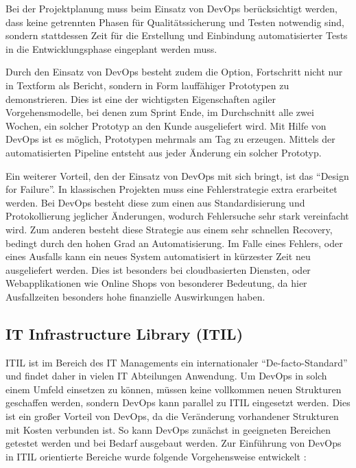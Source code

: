 Bei der Projektplanung muss beim Einsatz von DevOps berücksichtigt werden, dass keine getrennten Phasen für Qualitätssicherung und Testen notwendig sind, sondern stattdessen Zeit für die Erstellung und Einbindung automatisierter Tests in die Entwicklungsphase eingeplant werden muss. \parencite[Vgl.][S. 2]{Null:2014}

Durch den Einsatz von DevOps besteht zudem die Option, Fortschritt nicht nur in Textform als Bericht, sondern in Form lauffähiger Prototypen zu demonstrieren. 
Dies ist eine der wichtigsten Eigenschaften agiler Vorgehensmodelle, bei denen zum Sprint Ende, im Durchschnitt alle zwei Wochen, ein solcher Prototyp an den Kunde ausgeliefert wird. 
Mit Hilfe von DevOps ist es möglich, Prototypen mehrmals am Tag zu erzeugen. Mittels der automatisierten Pipeline entsteht aus jeder Änderung ein solcher Prototyp. \parencite[Vgl.][S. 3]{Null:2014}

Ein weiterer Vorteil, den der Einsatz von DevOps mit sich bringt, ist das \enquote{Design for Failure}. 
In klassischen Projekten muss eine Fehlerstrategie extra erarbeitet werden. Bei DevOps besteht diese zum einen aus Standardisierung und Protokollierung jeglicher Änderungen, wodurch Fehlersuche sehr stark vereinfacht wird. 
Zum anderen besteht diese Strategie aus einem sehr schnellen Recovery, bedingt durch den hohen Grad an Automatisierung. 
Im Falle eines Fehlers, oder eines Ausfalls kann ein neues System automatisiert in kürzester Zeit neu ausgeliefert werden. 
Dies ist besonders bei cloudbasierten Diensten, oder Webapplikationen wie Online Shops von besonderer Bedeutung, da hier Ausfallzeiten besonders hohe finanzielle Auswirkungen haben. 
\parencite[Vgl.][S. 3 - 4]{Null:2014}

\subsection{IT Infrastructure Library (ITIL)}
ITIL ist im Bereich des IT Managements ein internationaler \enquote{De-facto-Standard} und findet daher in vielen IT Abteilungen Anwendung. 
Um DevOps in solch einem Umfeld einsetzen zu können, müssen keine vollkommen neuen Strukturen geschaffen werden, sondern DevOps kann parallel zu ITIL eingesetzt werden. 
Dies ist ein großer Vorteil von DevOps, da die Veränderung vorhandener Strukturen mit Kosten verbunden ist. 
So kann DevOps zunächst in geeigneten Bereichen getestet werden und bei Bedarf ausgebaut werden.
Zur Einführung von DevOps in ITIL orientierte Bereiche wurde folgende Vorgehensweise entwickelt \parencite[vgl.][S. 1 - 3]{Sharp-Paul:2016}:

